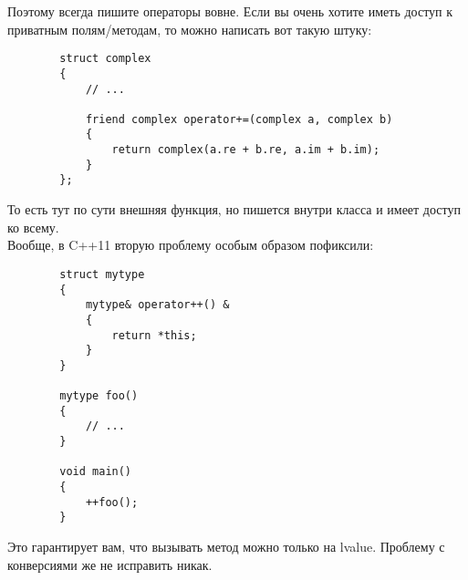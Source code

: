 \documentclass{article}
\begin{document}
    Поэтому всегда пишите операторы вовне. Если вы очень хотите иметь доступ к приватным полям/методам, то можно написать вот такую штуку:
    \begin{verbatim}
        struct complex
        {
            // ...

            friend complex operator+=(complex a, complex b)
            {
                return complex(a.re + b.re, a.im + b.im);
            }
        };
    \end{verbatim}
    То есть тут по сути внешняя функция, но пишется внутри класса и имеет доступ ко всему.\\
    Вообще, в C++11 вторую проблему особым образом пофиксили:
    \begin{verbatim}
        struct mytype
        {
            mytype& operator++() &
            {
                return *this;
            }
        }
        
        mytype foo()
        {
            // ...
        }
        
        void main()
        {
            ++foo();
        }
    \end{verbatim}
    Это гарантирует вам, что вызывать метод можно только на lvalue. Проблему с конверсиями же не исправить никак.
\end{document}
